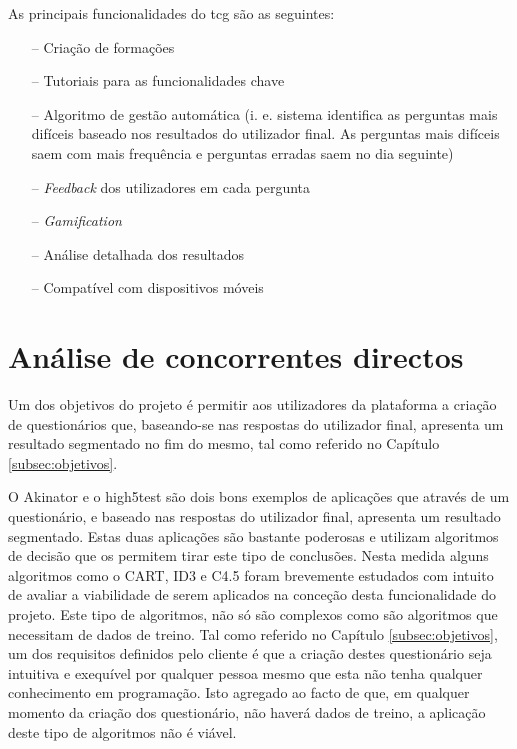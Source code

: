  As principais funcionalidades do  \acrshort{tcg}  são as seguintes:


\begin{itemize}
	\item[--] Criação de formações 
	\item[--] Tutoriais para as funcionalidades chave
	\item[--] Algoritmo de gestão automática (i. e. sistema identifica as perguntas mais difíceis baseado nos resultados do utilizador final. As perguntas mais difíceis saem com mais frequência e perguntas erradas saem no dia seguinte)
	\item[--] \textit{Feedback }dos utilizadores em cada pergunta
	\item[--] \textit{Gamification}
	\item[--] Análise detalhada dos resultados
	\item[--] Compatível com dispositivos móveis
\end{itemize}

\section{Análise de concorrentes directos}

Um dos objetivos do projeto é permitir aos utilizadores da plataforma a criação de questionários que, baseando-se nas respostas do utilizador final, apresenta um resultado  segmentado no fim do mesmo, tal como referido no Capítulo \ref{subsec:objetivos}.

O Akinator\cite{akinator} e o high5test\cite{5} são dois bons exemplos de aplicações que através de um questionário, e baseado nas respostas do utilizador final, apresenta um resultado segmentado. Estas duas aplicações são bastante poderosas e utilizam algoritmos de decisão que os permitem tirar este tipo de conclusões. Nesta medida alguns algoritmos como o CART\cite{cart}, ID3\cite{id3}\cite{id3_2}\cite{cart} e C4.5\cite{cart}\cite{c4.5} foram brevemente estudados com intuito de avaliar a viabilidade de serem aplicados na conceção desta funcionalidade do projeto. Este tipo de algoritmos, não só são complexos como são algoritmos que necessitam de dados de treino. Tal como referido no Capítulo \ref{subsec:objetivos}, um dos requisitos definidos pelo cliente é que a criação destes questionário seja intuitiva e exequível por qualquer pessoa mesmo que esta não tenha qualquer conhecimento em programação. Isto agregado ao facto de que, em qualquer momento da criação dos questionário, não haverá dados de treino, a aplicação deste tipo de algoritmos não é viável.

